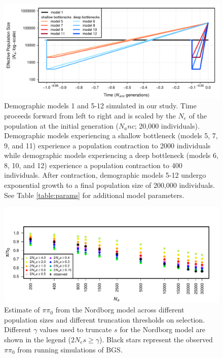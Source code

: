 \documentclass[9pt,twocolumn,twoside]{rilabRxiv}
\begin{document}
\begin{figure}[h!]
\includegraphics[width=.9\linewidth]{figures/FigS2.pdf}
\caption{Demographic models 1 and 5-12 simulated in our study.
Time proceeds forward from left to right and is scaled by the $N_e$ of the population at the initial generation ($N_anc$; 20,000 individuals).
Demographic models experiencing a shallow bottleneck (models 5, 7, 9, and 11) experience a population contraction to 2000 individuals while demographic models experiencing a deep bottleneck (models 6, 8, 10, and 12) experience a population contraction to 400 individuals.
After contraction, demographic models 5-12 undergo exponential growth to a final population size of 200,000 individuals.
See Table \ref{table:params} for additional model parameters.}
\label{fig:S2}
\end{figure}
\pagebreak

\begin{figure}[h!]
\includegraphics[width=.9\linewidth]{figures/FigS21.pdf}
\caption{Estimate of $\pi\pi_0$ from the Nordborg model across different population sizes and different truncation thresholds on selection.
Different $\gamma$ values used to truncate $s$ for the Nordborg model are shown in the legend ($2N_es \geq \gamma$).
Black stars represent the observed $\pi\pi_0$ from running simulations of BGS.}
\label{fig:nordborgsims}
\end{figure}
\pagebreak
\end{document}
